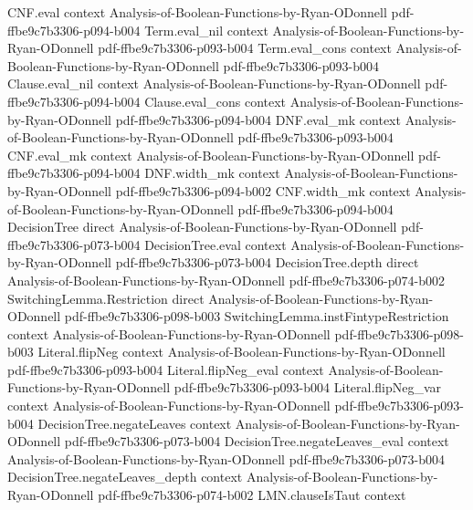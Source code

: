 \begin{theorem}
\proofstep
  {CNF.eval}
  {context}
  {Analysis-of-Boolean-Functions-by-Ryan-ODonnell}
  {pdf-ffbe9c7b3306-p094-b004}
\proofstep
  {Term.eval_nil}
  {context}
  {Analysis-of-Boolean-Functions-by-Ryan-ODonnell}
  {pdf-ffbe9c7b3306-p093-b004}
\proofstep
  {Term.eval_cons}
  {context}
  {Analysis-of-Boolean-Functions-by-Ryan-ODonnell}
  {pdf-ffbe9c7b3306-p093-b004}
\proofstep
  {Clause.eval_nil}
  {context}
  {Analysis-of-Boolean-Functions-by-Ryan-ODonnell}
  {pdf-ffbe9c7b3306-p094-b004}
\proofstep
  {Clause.eval_cons}
  {context}
  {Analysis-of-Boolean-Functions-by-Ryan-ODonnell}
  {pdf-ffbe9c7b3306-p094-b004}
\proofstep
  {DNF.eval_mk}
  {context}
  {Analysis-of-Boolean-Functions-by-Ryan-ODonnell}
  {pdf-ffbe9c7b3306-p093-b004}
\proofstep
  {CNF.eval_mk}
  {context}
  {Analysis-of-Boolean-Functions-by-Ryan-ODonnell}
  {pdf-ffbe9c7b3306-p094-b004}
\proofstep
  {DNF.width_mk}
  {context}
  {Analysis-of-Boolean-Functions-by-Ryan-ODonnell}
  {pdf-ffbe9c7b3306-p094-b002}
\proofstep
  {CNF.width_mk}
  {context}
  {Analysis-of-Boolean-Functions-by-Ryan-ODonnell}
  {pdf-ffbe9c7b3306-p094-b004}
\proofstep
  {DecisionTree}
  {direct}
  {Analysis-of-Boolean-Functions-by-Ryan-ODonnell}
  {pdf-ffbe9c7b3306-p073-b004}
\proofstep
  {DecisionTree.eval}
  {context}
  {Analysis-of-Boolean-Functions-by-Ryan-ODonnell}
  {pdf-ffbe9c7b3306-p073-b004}
\proofstep
  {DecisionTree.depth}
  {direct}
  {Analysis-of-Boolean-Functions-by-Ryan-ODonnell}
  {pdf-ffbe9c7b3306-p074-b002}
\proofstep
  {SwitchingLemma.Restriction}
  {direct}
  {Analysis-of-Boolean-Functions-by-Ryan-ODonnell}
  {pdf-ffbe9c7b3306-p098-b003}
\proofstep
  {SwitchingLemma.instFintypeRestriction}
  {context}
  {Analysis-of-Boolean-Functions-by-Ryan-ODonnell}
  {pdf-ffbe9c7b3306-p098-b003}
\proofstep
  {Literal.flipNeg}
  {context}
  {Analysis-of-Boolean-Functions-by-Ryan-ODonnell}
  {pdf-ffbe9c7b3306-p093-b004}
\proofstep
  {Literal.flipNeg_eval}
  {context}
  {Analysis-of-Boolean-Functions-by-Ryan-ODonnell}
  {pdf-ffbe9c7b3306-p093-b004}
\proofstep
  {Literal.flipNeg_var}
  {context}
  {Analysis-of-Boolean-Functions-by-Ryan-ODonnell}
  {pdf-ffbe9c7b3306-p093-b004}
\proofstep
  {DecisionTree.negateLeaves}
  {context}
  {Analysis-of-Boolean-Functions-by-Ryan-ODonnell}
  {pdf-ffbe9c7b3306-p073-b004}
\proofstep
  {DecisionTree.negateLeaves_eval}
  {context}
  {Analysis-of-Boolean-Functions-by-Ryan-ODonnell}
  {pdf-ffbe9c7b3306-p073-b004}
\proofstep
  {DecisionTree.negateLeaves_depth}
  {context}
  {Analysis-of-Boolean-Functions-by-Ryan-ODonnell}
  {pdf-ffbe9c7b3306-p074-b002}
\proofstep
  {LMN.clauseIsTaut}
  {context}

\end{theorem}
